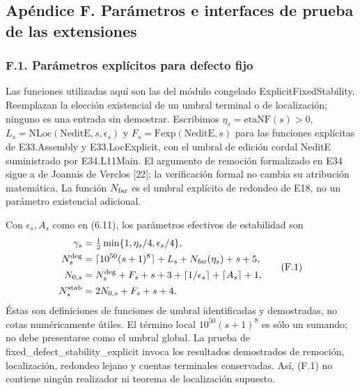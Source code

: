 \documentclass[spanish,11pt,a4paper]{article}
\begin{document}
\subsection{Apéndice F. Parámetros e interfaces de prueba de las extensiones}\label{apendice-f.-parametros-e-interfaces-de-prueba-de-las-extensiones}

\subsubsection{F.1. Parámetros explícitos para defecto fijo}\label{f.1.-parametros-explicitos-para-defecto-fijo}

Las funciones utilizadas aquí son las del módulo congelado {\ttfamily\small ExplicitFixe\discretionary{\hbox{\ensuremath{\hookrightarrow}}}{}{}dStability}. Reemplazan la elección existencial de un umbral terminal o de localización; ninguno es una entrada sin demostrar. Escribimos \(\eta_s=\mathrm{etaNF}(s)>0\), \(L_s=\mathrm{NLoc}(\mathrm{NeditE},s,\epsilon_s)\) y \(F_s=\mathrm{Fexp}(\mathrm{NeditE},s)\) para las funciones explícitas de {\ttfamily\small E33.\discretionary{\hbox{\ensuremath{\hookrightarrow}}}{}{}Assembly} y {\ttfamily\small E33.\discretionary{\hbox{\ensuremath{\hookrightarrow}}}{}{}LocExplicit}, con el umbral de edición cordal NeditE suministrado por {\ttfamily\small E34.\discretionary{\hbox{\ensuremath{\hookrightarrow}}}{}{}L11Main}. El argumento de remoción formalizado en E34 sigue a de Joannis de Verclos {[}22{]}; la verificación formal no cambia su atribución matemática. La función \(N_{\rm far}\) es el umbral explícito de redondeo de E18, no un parámetro existencial adicional.

Con \(\epsilon_s,A_s\) como en (6.11), los parámetros efectivos de estabilidad son \[
\begin{aligned}
\gamma_s&=\tfrac12\min\{1,\eta_s/4,\epsilon_s/4\},\\
N_s^{\rm deg}&=\lceil10^{50}(s+1)^8\rceil+L_s+
                    N_{\rm far}(\eta_s)+s+5,\\
N_{0,s}&=N_s^{\rm deg}+F_s+s+3+
                 \lceil1/\epsilon_s\rceil+\lceil A_s\rceil+1,\\
N_s^{\rm stab}&=2N_{0,s}+F_s+s+4.
\end{aligned}
\tag{F.1}
\] Éstas son definiciones de funciones de umbral identificadas y demostradas, no cotas numéricamente útiles. El término local \(10^{50}(s+1)^8\) es sólo un sumando; no debe presentarse como el umbral global. La prueba de {\ttfamily\small fixed\_\discretionary{\hbox{\ensuremath{\hookrightarrow}}}{}{}defect\_\discretionary{\hbox{\ensuremath{\hookrightarrow}}}{}{}stability\_\discretionary{\hbox{\ensuremath{\hookrightarrow}}}{}{}explicit} invoca los resultados demostrados de remoción, localización, redondeo lejano y cuentas terminales conservadas. Así, (F.1) no contiene ningún realizador ni teorema de localización supuesto.
\end{document}
